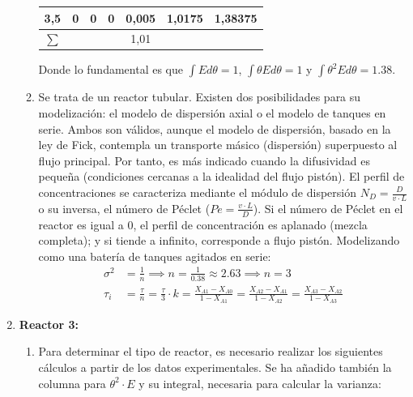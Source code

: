 \begin{enumerate}
\begin{enumerate}[label={\alph*)}]
\begin{center}
\begin{tabular}{|c|c|c|c|c|c|c|}
				            3,5                          & 0                     & 0                & 0                     & 0,005               & 1,0175                           & 1,38375                            \\ \hline
				            \multicolumn{1}{|c|}{$\sum$} & \multicolumn{3}{c|}{} & 1,01             & \multicolumn{2}{c|}{}                                                                                               \\ \hline
			            \end{tabular}
		            \end{center}
		            Donde lo fundamental es que $\int E d\theta = 1$, $\int \theta E d\theta = 1$ y $\int \theta^2 E d\theta = 1.38$.

		      \item Se trata de un reactor tubular. Existen dos posibilidades para su modelización: el modelo de dispersión axial o el modelo de tanques en serie. Ambos son válidos, aunque el modelo de dispersión, basado en la ley de Fick, contempla un transporte másico (dispersión) superpuesto al flujo principal. Por tanto, es más indicado cuando la difusividad es pequeña (condiciones cercanas a la idealidad del flujo pistón). El perfil de concentraciones se caracteriza mediante el módulo de dispersión $N_D = \frac{D}{v\cdot L}$ o su inversa, el número de Péclet ($Pe = \frac{v\cdot L}{D}$).
		            Si el número de Péclet en el reactor es igual a 0, el perfil de concentración es aplanado (mezcla completa); y si tiende a infinito, corresponde a flujo pistón. Modelizando como una batería de tanques agitados en serie:
		            \begin{align*}
			            \sigma^2 & = \frac{1}{n} \implies n = \frac{1}{0.38} \approx 2.63 \implies n = 3                                                                        \\
			            \tau_i   & = \frac{\tau}{n} = \frac{\tau}{3} \cdot k = \frac{X_{A1}-X_{A0}}{1-X_{A1}} = \frac{X_{A2}-X_{A1}}{1-X_{A2}} = \frac{X_{A3}-X_{A2}}{1-X_{A3}}
		            \end{align*}
	      \end{enumerate}
	\item \textbf{Reactor 3:}
	      \begin{enumerate}[label={\alph*)}]
		      \item Para determinar el tipo de reactor, es necesario realizar los siguientes cálculos a partir de los datos experimentales. Se ha añadido también la columna para $\theta^2 \cdot E$ y su integral, necesaria para calcular la varianza:


\end{enumerate}
\end{enumerate}

